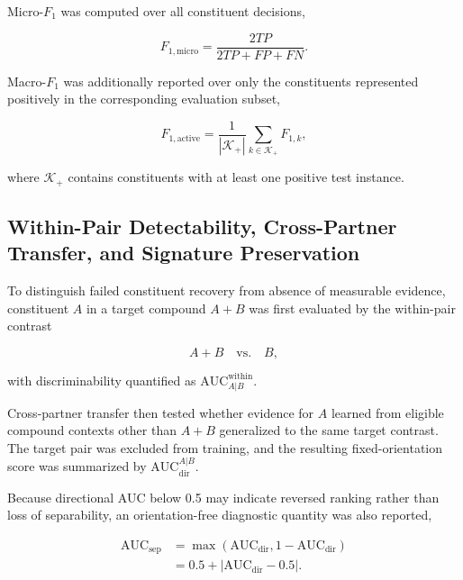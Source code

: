 \documentclass{ieeeaccess}
\begin{document}
Micro-$F_1$ was computed over all constituent decisions,

\begin{equation}
F_{1,\mathrm{micro}}
=
\frac{2TP}{2TP+FP+FN}.
\label{eq:micro_f1}
\end{equation}

Macro-$F_1$ was additionally reported over only the constituents represented
positively in the corresponding evaluation subset,

\begin{equation}
F_{1,\mathrm{active}}
=
\frac{1}{|\mathcal{K}_{+}|}
\sum_{k\in\mathcal{K}_{+}} F_{1,k},
\label{eq:active_macro_f1}
\end{equation}

where $\mathcal{K}_{+}$ contains constituents with at least one positive test
instance.

\subsection{Within-Pair Detectability, Cross-Partner Transfer, and Signature Preservation}
\label{subsec:transferability}

To distinguish failed constituent recovery from absence of measurable
evidence, constituent $A$ in a target compound $A+B$ was first evaluated by
the within-pair contrast

\begin{equation}
A+B \quad \mathrm{vs.} \quad B,
\label{eq:oracle_contrast}
\end{equation}

with discriminability quantified as
$\mathrm{AUC}^{\mathrm{within}}_{A|B}$.

Cross-partner transfer then tested whether evidence for $A$ learned from
eligible compound contexts other than $A+B$ generalized to the same target
contrast. The target pair was excluded from training, and the resulting
fixed-orientation score was summarized by
$\mathrm{AUC}^{A|B}_{\mathrm{dir}}$.

Because directional AUC below 0.5 may indicate reversed ranking rather than
loss of separability, an orientation-free diagnostic quantity was also
reported,

\begin{equation}
\begin{aligned}
\mathrm{AUC}_{\mathrm{sep}}
&=
\max\left(
\mathrm{AUC}_{\mathrm{dir}},
1-\mathrm{AUC}_{\mathrm{dir}}
\right)\\
&=
0.5+
\left|
\mathrm{AUC}_{\mathrm{dir}}-0.5
\right|.
\end{aligned}
\label{eq:separability_auc}
\end{equation}
\end{document}
